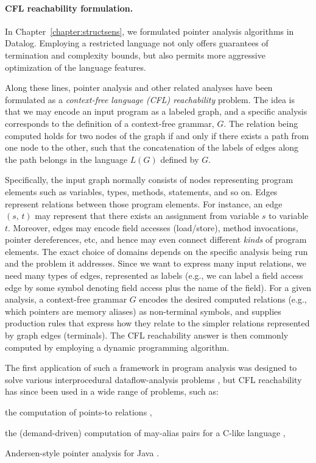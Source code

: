 
\paragraph{CFL reachability formulation.} In
Chapter~\ref{chapter:structsens}, we formulated pointer analysis
algorithms in Datalog. Employing a restricted language not only offers
guarantees of termination and complexity bounds, but also permits more
aggressive optimization of the language features.

Along these lines, pointer analysis and other related analyses have
been formulated as a \emph{context-free language (CFL) reachability}
problem. The idea is that we may encode an input program as a labeled
graph, and a specific analysis corresponds to the definition of a
context-free grammar, \(G\). The relation being computed holds for two
nodes of the graph if and only if there exists a path from one node to
the other, such that the concatenation of the labels of edges along
the path belongs in the language \(L(G)\) defined by \(G\).

Specifically, the input graph normally consists of nodes representing
program elements such as variables, types, methods, statements, and so
on. Edges represent relations between those program elements. For
instance, an edge \((s,\,t)\) may represent that there exists an
assignment from variable \(s\) to variable \(t\). Moreover, edges may
encode field accesses (load/store), method invocations, pointer
dereferences, etc, and hence may even connect different \emph{kinds}
of program elements. The exact choice of domains depends on the
specific analysis being run and the problem it addresses. Since we
want to express many input relations, we need many types of edges,
represented as labels (e.g., we can label a field access edge by some
symbol denoting field access plus the name of the field).  For a given
analysis, a context-free grammar \(G\) encodes the desired computed
relations (e.g., which pointers are memory aliases) as non-terminal
symbols, and supplies production rules that express how they relate to
the simpler relations represented by graph edges (terminals). The CFL
reachability answer is then commonly computed by employing a dynamic
programming algorithm.

The first application of such a framework in program analysis was
designed to solve various interprocedural dataflow-analysis problems
\cite{popl/RepsHS95}, but CFL reachability has since been used in a
wide range of problems, such as:
\begin{inparaenum}[(i)]
\item the computation of points-to relations
  \cite{journals/infsof/Reps98},
\item the (demand-driven) computation of may-alias pairs for a C-like
  language \cite{popl/ZhengR08},
\item Andersen-style pointer analysis for Java
  \cite{oopsla/SridharanGSB05}.
\end{inparaenum}


